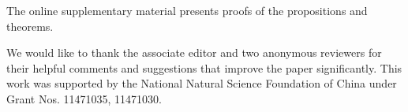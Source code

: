 \documentclass[12pt]{article} %
\newcommand{\bX}{\mathbf{X}}
\newcommand{\bJ}{\mathbf{J}}
\newcommand{\bC}{\mathbf{C}}
\theoremstyle{definition}
\begin{document}
%











\vskip 14pt

The online supplementary material presents proofs of the propositions and theorems.
\par
\vskip 14pt
We would like to thank the associate editor and two anonymous reviewers for their helpful comments and suggestions that improve the paper significantly.
This work was supported by the National Natural Science Foundation of
China under Grant Nos. 11471035, 11471030.
\par
\end{document}
